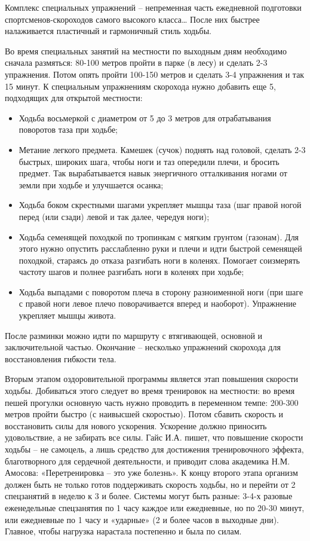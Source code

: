 \documentclass[14pt, a4paper]{article}
\begin{document}
    Комплекс специальных упражнений – непременная часть ежедневной  подготовки спортсменов-скороходов самого высокого класса… После них быстрее налаживается пластичный и гармоничный стиль ходьбы.

    Во время специальных занятий на местности по выходным дням  необходимо сначала размяться: 80-100 метров пройти в парке (в лесу) и  сделать 2-3 упражнения. Потом опять пройти 100-150 метров и сделать 3-4  упражнения и так 15 минут. К специальным упражнениям скорохода нужно добавить еще 5, подходящих для открытой местности:

    \begin{itemize}
        \item Ходьба восьмеркой с диаметром от 5 до 3 метров для отрабатывания поворотов таза при ходьбе;
        \item Метание легкого предмета. Камешек (сучок) поднять над головой, сделать 2-3 быстрых, широких шага, чтобы ноги и таз опередили плечи, и бросить предмет. Так вырабатывается навык энергичного отталкивания ногами от земли при ходьбе и улучшается осанка;
        \item Ходьба боком скрестными шагами укрепляет мышцы таза (шаг правой ногой перед (или сзади) левой и так далее, чередуя ноги);
        \item Ходьба семенящей походкой по тропинкам с мягким грунтом (газонам). Для этого нужно опустить расслабленно руки и плечи и идти быстрой семенящей походкой, стараясь до отказа разгибать ноги в коленях. Помогает соизмерять частоту шагов и полнее разгибать ноги в коленях при ходьбе;
        \item Ходьба выпадами с поворотом плеча в сторону разноименной ноги (при шаге с правой ноги левое плечо поворачивается вперед и наоборот). Упражнение укрепляет мышцы живота.
    \end{itemize}

    После разминки можно идти по маршруту с втягивающей, основной и  заключительной частью. Окончание – несколько упражнений скорохода для восстановления гибкости тела.

    Вторым этапом оздоровительной программы является этап повышения скорости ходьбы. Добиваться этого следует во время тренировок на местности: во время пешей прогулки основную часть нужно проводить в переменном темпе: 200-300 метров пройти быстро (с наивысшей скоростью). Потом сбавить скорость и восстановить силы для нового ускорения. Ускорение должно приносить удовольствие, а не забирать все силы. Гайс И.А. пишет, что повышение скорости ходьбы – не самоцель, а  лишь средство для достижения тренировочного эффекта, благотворного для сердечной деятельности, и приводит слова академика Н.М. Амосова: «Перетренировка – это  уже болезнь». К концу второго этапа организм должен быть не только готов поддерживать скорость ходьбы, но и перейти от 2 спецзанятий в неделю к 3 и более. Системы могут быть разные: 3-4-х разовые еженедельные спецзанятия по 1 часу каждое или ежедневные, но по 20-30 минут, или ежедневные по 1 часу и «ударные» (2 и более часов в выходные  дни). Главное, чтобы нагрузка  нарастала  постепенно и была по силам.
\end{document}
